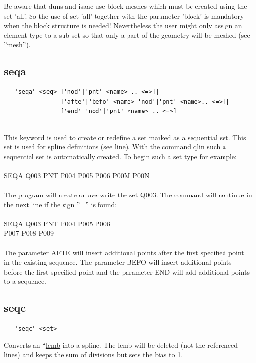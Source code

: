 \documentclass{article}
\providecommand{\htmlref}[2]{\hyperref[#2]{#1}}
\begin{document}
Be aware that duns and isaac use block meshes which must be created using the set 'all'. So the use of set 'all' together with the parameter 'block' is mandatory when the block structure is needed! Nevertheless the user might only assign an element type to a sub set so that only a part of the geometry will be meshed (see ''\htmlref{mesh}{mesh}'').


\subsection{\label{seqa}seqa}
\begin{verbatim}
   'seqa' <seq> ['nod'|'pnt' <name> .. <=>]|
                ['afte'|'befo' <name> 'nod'|'pnt' <name>.. <=>]|
                ['end' 'nod'|'pnt' <name> .. <=>]
                 
\end{verbatim}
This keyword is used to create or redefine a set marked as a sequential set. This set is used for spline definitions (see \htmlref{line}{line}). With the command \htmlref{qlin}{qlin} such a sequential set is automatically created. To begin such a set type for example:\\\\SEQA  Q003     PNT  P004 P005 P006 P00M P00N\\\\The program will create or overwrite the set Q003. The command will continue in the next line if the sign ''='' is found:\\\\SEQA  Q003     PNT  P004 P005 P006 =\\                    P007 P008 P009\\\\The parameter AFTE will insert additional points after the first specified point in the existing sequence. The parameter BEFO will insert additional points before the first specified point and the parameter END will add additional points to a sequence.

\subsection{\label{seqc}seqc}
\begin{verbatim}
   'seqc' <set>
\end{verbatim}
Converts an ``\htmlref{lcmb}{lcmb} into a spline. The lcmb will be deleted (not the referenced lines) and keeps the sum of divisions but sets the bias to 1.
\end{document}
